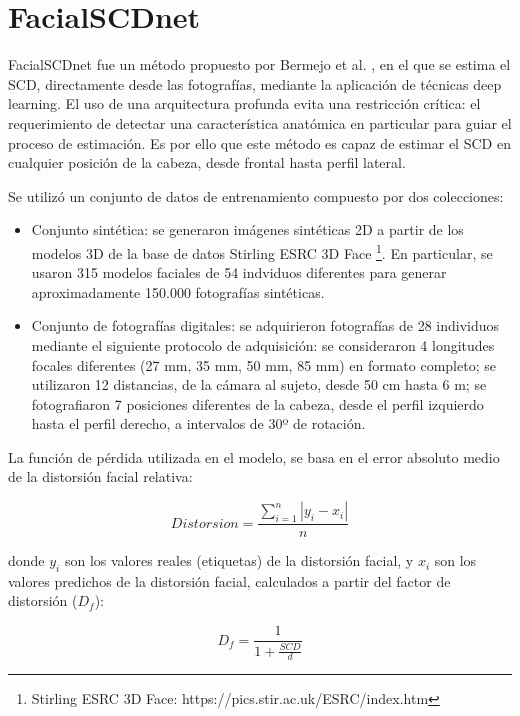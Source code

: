 \section{FacialSCDnet}

FacialSCDnet fue un método propuesto por Bermejo et al. \cite{14}, en el que se estima el SCD, directamente desde las fotografías, mediante la aplicación de técnicas deep learning. El uso de una arquitectura profunda evita una restricción crítica: el requerimiento de detectar una característica anatómica en particular para guiar el proceso de estimación. Es por ello que este método es capaz de estimar el SCD en cualquier posición de la cabeza, desde frontal hasta perfil lateral.

Se utilizó un conjunto de datos de entrenamiento compuesto por dos colecciones: 

\begin{itemize}
	\item Conjunto sintética: se generaron imágenes sintéticas 2D a partir de los modelos 3D de la base de datos Stirling ESRC 3D Face \footnote{Stirling ESRC 3D Face: https://pics.stir.ac.uk/ESRC/index.htm}. En particular, se usaron 315 modelos faciales de 54 indviduos diferentes para generar aproximadamente 150.000 fotografías sintéticas.
	\item Conjunto de fotografías digitales: se adquirieron fotografías de 28 individuos mediante el siguiente protocolo de adquisición: se consideraron 4 longitudes focales diferentes (27 mm, 35 mm, 50 mm, 85 mm) en formato completo; se utilizaron 12 distancias, de la cámara al sujeto, desde 50 cm hasta 6 m; se fotografiaron 7 posiciones diferentes de la cabeza, desde el perfil izquierdo hasta el perfil derecho, a intervalos de 30º de rotación.
\end{itemize}

La función de pérdida utilizada en el modelo, se basa en el error absoluto medio de la distorsión facial relativa:

\begin{equation}
	Distorsion = \frac{\sum_{i=1}^{n} |y_i - x_i|}{n}
\end{equation}

donde $y_i$ son los valores reales (etiquetas) de la distorsión facial, y $x_i$ son los valores predichos de la distorsión facial, calculados a partir del factor de distorsión ($D_f$):

\begin{equation}
	D_f = \frac{1}{1 + \frac{SCD}{d}}
	\label{eq:df}
\end{equation}

